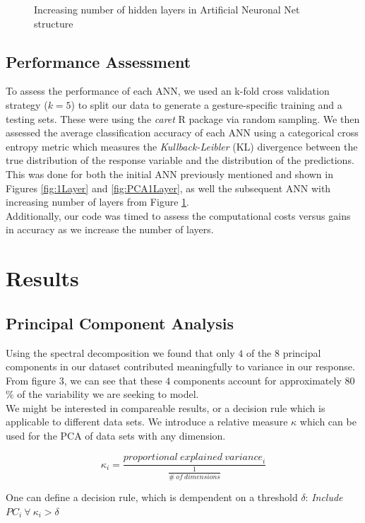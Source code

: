 \documentclass{article}
\begin{document}
\begin{figure}[h]
\begin{subfigure}{.6\textwidth}
\end{subfigure}
\caption{Increasing number of hidden layers in Artificial Neuronal Net structure}
\label{fig:5Layers}
\end{figure}

\subsection{Performance Assessment}
To assess the performance of each ANN, we used an k-fold cross validation strategy ($k =5$) to split our data to generate a gesture-specific training and a testing sets. These were using the \textit{caret} R package via random sampling. We then assessed the average classification accuracy of each ANN using a categorical cross entropy metric which measures the \textit{Kullback-Leibler} (KL) divergence between the true distribution of the response variable and the distribution of the predictions. This was done for both the initial ANN previously mentioned and shown in Figures \ref{fig:1Layer} and \ref{fig:PCA1Layer}, as well the subsequent ANN with increasing number of layers from Figure \ref{fig:5Layers}.\\
Additionally, our code was timed to assess the computational costs versus gains in accuracy as we increase the number of layers.


\section{Results}

\subsection{Principal Component Analysis}

Using the spectral decomposition we found that only $4$ of the $8$ principal components in our dataset contributed meaningfully to variance in our response. From figure $3$, we can see that these $4$ components account for approximately $80$\% of the variability we are seeking to model.\\
We might be interested in compareable results, or a decision rule which is applicable to different data sets. We introduce a relative measure $\kappa$ which can be used for the PCA of data sets with any dimension.

\[\kappa_i=\frac{{proportional\ explained\ variance}_i}{\frac{1}{{\#\ of\ dimensions}}}\]

One can define a decision rule, which is dempendent on a threshold $\delta$: \textit{Include $PC_i \ \forall \ \kappa_i>\delta$}
\end{document}
